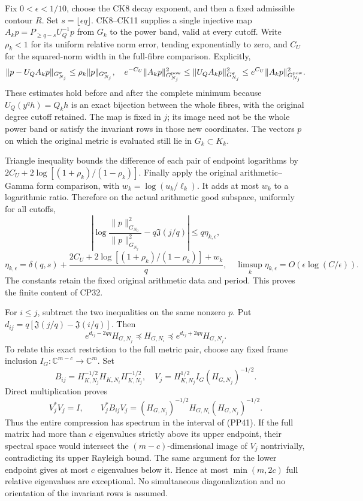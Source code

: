 \documentclass[10pt]{article}
\begin{document}
Fix \(0<\epsilon<1/10\), choose the CK8 decay exponent, and then a fixed admissible contour \(R\). Set \(s=\lfloor\epsilon q\rfloor\). CK8--CK11 supplies a single injective map \(A_kp=P_{\ge q-s}U_Q^{-1}p\) from \(G_k\) to the power band, valid at every cutoff. Write \(\rho_k<1\) for its uniform relative norm error, tending exponentially to zero, and \(C_U\) for the squared-norm width in the full-fibre comparison. Explicitly, \[
\|p-U_QA_kp\|_{G_{N_j}^\sigma}\le\rho_k\|p\|_{G_{N_j}^\sigma},
\quad
e^{-C_U}\|A_kp\|_{G_{N_j}^{\rm pow}}^2
\le\|U_QA_kp\|_{G_{N_j}^\sigma}^2
\le e^{C_U}\|A_kp\|_{G_{N_j}^{\rm pow}}^2.
\] These estimates hold before and after the complete minimum because \(U_Q(y^qh)=Q_kh\) is an exact bijection between the whole fibres, with the original degree cutoff retained. The map is fixed in \(j\); its image need not be the whole power band or satisfy the invariant rows in those new coordinates. The vectors \(p\) on which the original metric is evaluated still lie in \(G_k\subset K_k\).

Triangle inequality bounds the difference of each pair of endpoint logarithms by \(2C_U+2\log[(1+\rho_k)/(1-\rho_k)]\). Finally apply the original arithmetic--Gamma form comparison, with \(w_k=\log(u_k/\ell_k)\). It adds at most \(w_k\) to a logarithmic ratio. Therefore on the actual arithmetic good subspace, uniformly for all cutoffs, \[
\left|\log\frac{\|p\|_{G_{N_0}}^2}{\|p\|_{G_{N_j}}^2}
-q\mathfrak J(j/q)\right|\le q\eta_{k,\epsilon},
\tag{PP39}
\] \[
\eta_{k,\epsilon}=\delta(q,s)+
\frac{2C_U+2\log[(1+\rho_k)/(1-\rho_k)]+w_k}{q},
\quad
\limsup_k\eta_{k,\epsilon}=O(\epsilon\log(C/\epsilon)).
\tag{PP40}
\] The constants retain the fixed original arithmetic data and period. This proves the finite content of CP32.

For \(i\le j\), subtract the two inequalities on the same nonzero \(p\). Put \(d_{ij}=q[\mathfrak J(j/q)-\mathfrak J(i/q)]\). Then \[
e^{d_{ij}-2q\eta}H_{G,N_j}
\preceq H_{G,N_i}\preceq e^{d_{ij}+2q\eta}H_{G,N_j}.
\tag{PP41}
\] To relate this exact restriction to the full metric pair, choose any fixed frame inclusion \(I_G:\mathbb C^{m-c}\to\mathbb C^m\). Set \[
B_{ij}=H_{K,N_j}^{-1/2}H_{K,N_i}H_{K,N_j}^{-1/2},
\quad V_j=H_{K,N_j}^{1/2}I_G(H_{G,N_j})^{-1/2}.
\] Direct multiplication proves \[
V_j^*V_j=I,\qquad
V_j^*B_{ij}V_j=(H_{G,N_j})^{-1/2}H_{G,N_i}(H_{G,N_j})^{-1/2}.
\tag{PP42}
\] Thus the entire compression has spectrum in the interval of (PP41). If the full matrix had more than \(c\) eigenvalues strictly above its upper endpoint, their spectral space would intersect the \((m-c)\)-dimensional image of \(V_j\) nontrivially, contradicting its upper Rayleigh bound. The same argument for the lower endpoint gives at most \(c\) eigenvalues below it. Hence at most \(\min(m,2c)\) full relative eigenvalues are exceptional. No simultaneous diagonalization and no orientation of the invariant rows is assumed.
\end{document}
